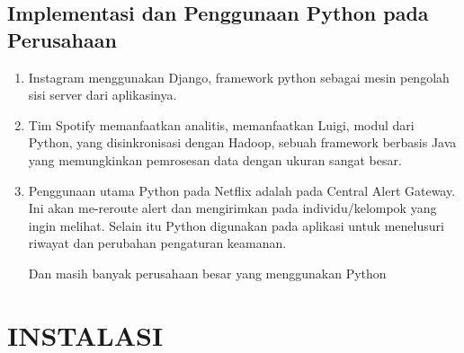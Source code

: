 \documentclass{article}
\begin{document}
\subsection{Implementasi dan Penggunaan Python pada Perusahaan}
    \begin{enumerate}
        \item Instagram menggunakan Django, framework python sebagai mesin pengolah sisi server dari aplikasinya.
        \item Tim Spotify memanfaatkan analitis, memanfaatkan Luigi, modul dari Python, yang disinkronisasi dengan Hadoop, sebuah framework berbasis Java yang memungkinkan pemrosesan data dengan ukuran sangat besar.
        \item Penggunaan utama Python pada Netflix adalah pada Central Alert Gateway. Ini akan me-reroute alert dan mengirimkan pada individu/kelompok yang ingin melihat. Selain itu Python digunakan pada aplikasi untuk menelusuri riwayat dan perubahan pengaturan keamanan.
    \par Dan masih banyak perusahaan besar yang menggunakan Python
    \end{enumerate}    
    
\newpage    
\section{INSTALASI}
\end{document}

